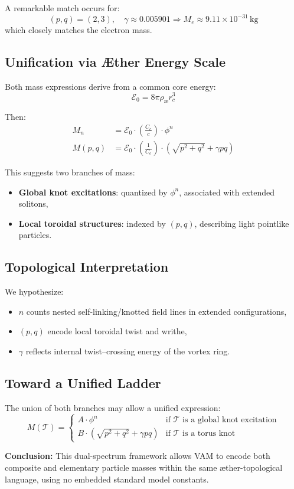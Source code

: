 A remarkable match occurs for:
\[
(p,q) = (2,3), \quad \gamma \approx 0.005901
\Rightarrow M_e \approx 9.11 \times 10^{-31} \, \text{kg}
\]
which closely matches the electron mass.

\subsection{Unification via Æther Energy Scale}

Both mass expressions derive from a common core energy:
\[
\mathcal{E}_0 = 8\pi \rho_{\text{æ}} r_c^3
\]

Then:
\begin{align}
M_n &= \mathcal{E}_0 \cdot \left( \frac{C_e}{c} \right) \cdot \phi^n \\
M(p,q) &= \mathcal{E}_0 \cdot \left( \frac{1}{C_e} \right) \cdot \left( \sqrt{p^2 + q^2} + \gamma pq \right)
\end{align}

This suggests two branches of mass:
\begin{itemize}
  \item \textbf{Global knot excitations}: quantized by $\phi^n$, associated with extended solitons,
  \item \textbf{Local toroidal structures}: indexed by $(p,q)$, describing light pointlike particles.
\end{itemize}

\subsection{Topological Interpretation}

We hypothesize:
\begin{itemize}
  \item $n$ counts nested self-linking/knotted field lines in extended configurations,
  \item $(p,q)$ encode local toroidal twist and writhe,
  \item $\gamma$ reflects internal twist–crossing energy of the vortex ring.
\end{itemize}

\subsection{Toward a Unified Ladder}

The union of both branches may allow a unified expression:
\[
M(\mathcal{T}) =
\begin{cases}
A \cdot \phi^n & \text{if } \mathcal{T} \text{ is a global knot excitation} \\
B \cdot \left( \sqrt{p^2 + q^2} + \gamma pq \right) & \text{if } \mathcal{T} \text{ is a torus knot}
\end{cases}
\]

\textbf{Conclusion:} This dual-spectrum framework allows VAM to encode both composite and elementary particle masses within the same æther-topological language, using no embedded standard model constants.

